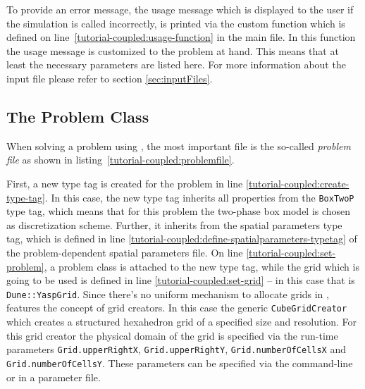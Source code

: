\begin{lst}\label{tutorial-coupled:parameter-file} \mbox{}

\end{lst}

To provide an error message, the usage message which is displayed to
the user if the simulation is called incorrectly, is printed via the
custom function which is defined on
line~\ref{tutorial-coupled:usage-function} in the main file. 
In this function the usage message is customized to the problem at hand. 
This means that at least the necessary parameters are listed here.  
For more information about the input file please refer to section \ref{sec:inputFiles}.


\subsection{The Problem Class}\label{tutorial-coupled:problem}

When solving a problem using \Dumux, the most important file is the
so-called \textit{problem file} as shown in
listing~\ref{tutorial-coupled:problemfile}.

\begin{lst}\label{tutorial-coupled:problemfile} \mbox{}

\end{lst}

First, a new type tag is created for the problem in line
\ref{tutorial-coupled:create-type-tag}.  In this case, the new type
tag inherits all properties from the \texttt{BoxTwoP} type tag, which
means that for this problem the two-phase box model is chosen as
discretization scheme. Further, it inherits from the spatial
parameters type tag, which is defined in line
\ref{tutorial-coupled:define-spatialparameters-typetag} of the problem-dependent spatial
parameters file.  On line
\ref{tutorial-coupled:set-problem}, a problem class is attached to the
new type tag, while the grid which is going to be used is defined in
line \ref{tutorial-coupled:set-grid} -- in this case that is
\texttt{Dune::YaspGrid}.  Since there's no uniform mechanism to
allocate grids in \Dune, \Dumux features the concept of grid creators.
In this case the generic \texttt{CubeGridCreator} which creates a
structured hexahedron grid of a specified size and resolution. For
this grid creator the  physical domain of the grid is specified via the
run-time parameters \texttt{Grid.upperRightX},
\texttt{Grid.upperRightY}, \texttt{Grid.numberOfCellsX} and
\texttt{Grid.numberOfCellsY}. These parameters can be specified via
the command-line or in a parameter file.

